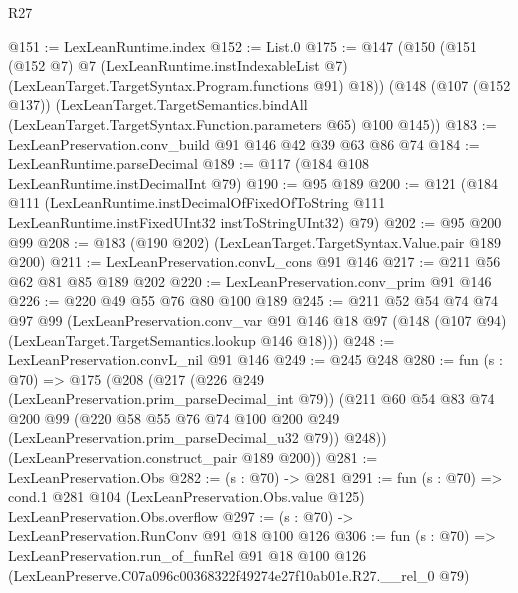 \begin{lexlean}{R27}
\begin{coremodule}
@151 := LexLeanRuntime.index
@152 := List.{0}
@175 := @147
    (@150
      (@151
        (@152 @7)
        @7
        (LexLeanRuntime.instIndexableList @7)
        (LexLeanTarget.TargetSyntax.Program.functions @91)
        @18))
    (@148
      (@107 (@152 @137))
      (LexLeanTarget.TargetSemantics.bindAll
        (LexLeanTarget.TargetSyntax.Function.parameters @65)
        @100
        @145))
@183 := LexLeanPreservation.conv_build @91 @146 @42 @39 @63 @86 @74
@184 := LexLeanRuntime.parseDecimal
@189 := @117 (@184 @108 LexLeanRuntime.instDecimalInt @79)
@190 := @95 @189
@200 := @121
    (@184
      @111
      (LexLeanRuntime.instDecimalOfFixedOfToString
        @111
        LexLeanRuntime.instFixedUInt32
        instToStringUInt32)
      @79)
@202 := @95 @200 @99
@208 := @183 (@190 @202) (LexLeanTarget.TargetSyntax.Value.pair @189 @200)
@211 := LexLeanPreservation.convL_cons @91 @146
@217 := @211 @56 @62 @81 @85 @189 @202
@220 := LexLeanPreservation.conv_prim @91 @146
@226 := @220 @49 @55 @76 @80 @100 @189
@245 := @211
    @52
    @54
    @74
    @74
    @97
    @99
    (LexLeanPreservation.conv_var
      @91
      @146
      @18
      @97
      (@148 (@107 @94) (LexLeanTarget.TargetSemantics.lookup @146 @18)))
@248 := LexLeanPreservation.convL_nil @91 @146
@249 := @245 @248
@280 := fun (s : @70) =>
  @175
    (@208
      (@217
        (@226 @249 (LexLeanPreservation.prim_parseDecimal_int @79))
        (@211
          @60
          @54
          @83
          @74
          @200
          @99
          (@220 @58 @55 @76 @74 @100 @200 @249 (LexLeanPreservation.prim_parseDecimal_u32 @79))
          @248))
      (LexLeanPreservation.construct_pair @189 @200))
@281 := LexLeanPreservation.Obs
@282 := (s : @70) -> @281
@291 := fun (s : @70) =>
  cond.{1} @281 @104 (LexLeanPreservation.Obs.value @125) LexLeanPreservation.Obs.overflow
@297 := (s : @70) -> LexLeanPreservation.RunConv @91 @18 @100 @126
@306 := fun (s : @70) =>
  LexLeanPreservation.run_of_funRel
    @91
    @18
    @100
    @126
    (LexLeanPreserve.C07a096c00368322f49274e27f10ab01e.R27.__rel_0 @79)
\end{coremodule}
\end{lexlean}
